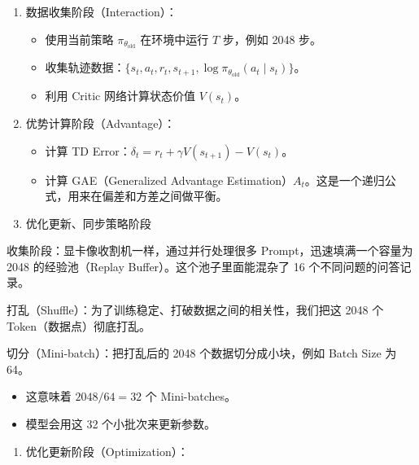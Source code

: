 \begin{enumerate}
\def\labelenumi{\arabic{enumi}.}
\tightlist
\item
  数据收集阶段（Interaction）：

  \begin{itemize}
  \tightlist
  \item
    使用当前策略 \(\pi_{\theta_{\mathrm{old}}}\) 在环境中运行 \(T\) 步，例如 2048 步。
  \item
    收集轨迹数据：\(\{s_t, a_t, r_t, s_{t+1}, \log \pi_{\theta_{\mathrm{old}}}(a_t \mid s_t)\}\)。
  \item
    利用 Critic 网络计算状态价值 \(V(s_t)\)。
  \end{itemize}
\item
  优势计算阶段（Advantage）：

  \begin{itemize}
  \tightlist
  \item
    计算 TD Error：\(\delta_t = r_t + \gamma V(s_{t+1}) - V(s_t)\)。
  \item
    计算 GAE（Generalized Advantage Estimation）\(A_t\)。这是一个递归公式，用来在偏差和方差之间做平衡。
  \end{itemize}
\item
  优化更新、同步策略阶段
\end{enumerate}

收集阶段：显卡像收割机一样，通过并行处理很多 Prompt，迅速填满一个容量为 2048 的经验池（Replay Buffer）。这个池子里面能混杂了 16 个不同问题的问答记录。

打乱（Shuffle）：为了训练稳定、打破数据之间的相关性，我们把这 2048 个 Token（数据点）彻底打乱。

切分（Mini-batch）：把打乱后的 2048 个数据切分成小块，例如 Batch Size 为 64。

\begin{itemize}
\tightlist
\item
  这意味着 \(2048 / 64 = 32\) 个 Mini-batches。
\item
  模型会用这 32 个小批次来更新参数。
\end{itemize}

\begin{enumerate}
\def\labelenumi{\arabic{enumi}.}
\setcounter{enumi}{2}
\tightlist
\item
  优化更新阶段（Optimization）：
\end{enumerate}

